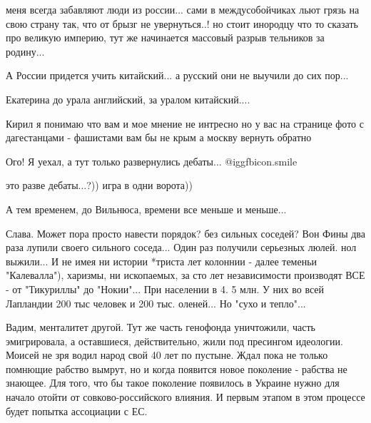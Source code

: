 \begin{itemize}

меня всегда забавляют люди из россии... сами в междусобойчиках льют грязь на
свою страну так, что от брызг не увернуться..! но стоит инородцу что то сказать
про великую империю, тут же начинается массовый разрыв тельников за родину...


А России придется учить китайский... а русский они не выучили до сих пор...

Екатерина до урала английский, за уралом китайский....


Кирил я понимаю что вам и мое мнение не интресно но у вас на странице фото с
дагестанцами - фашистами вам бы не крым а москву вернуть обратно

Ого! Я уехал, а тут только развернулись дебаты...  @igg{fbicon.smile} 

это разве дебаты...?)) игра в одни ворота))

А тем временем, до Вильнюса, времени все меньше и меньше...


Слава. Может пора просто навести порядок? без сильных соседей? Вон Фины два раза
лупили своего сильного соседа... Один раз получили серьезных люлей. нол
выжили... И не имея ни истории *триста лет колоннии - далее теменьи
"Калевалла"), харизмы, ни ископаемых, за сто лет независимости производят ВСЕ -
от "Тикуриллы" до "Нокии"... При населении в 4. 5 млн. У них во всей Лапландии 200
тыс человек и 200 тыс. оленей... Но "сухо и тепло"...



Вадим, менталитет другой. Тут же часть генофонда уничтожили, часть
эмигрировала, а оставшиеся, действительно, жили под пресингом идеологии. Моисей
не зря водил народ свой 40 лет по пустыне. Ждал пока не только помнющие рабство
вымрут, но и когда появится новое поколение - рабства не знающее. Для того, что
бы такое поколение появилось в Украине нужно для начало отойти от
совково-российского влияния. И первым этапом в этом процессе будет попытка
ассоциации с ЕС.

\end{itemize} %
